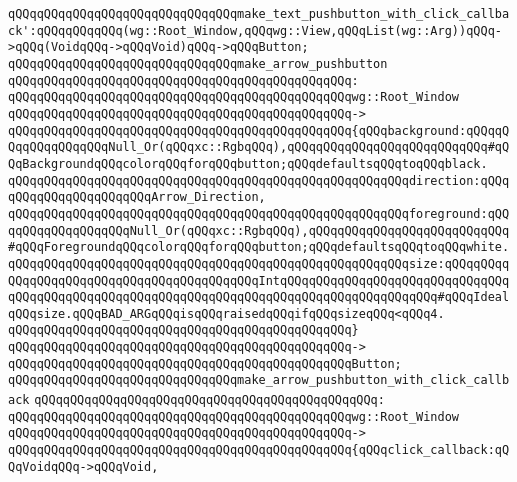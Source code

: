 \verb|qQQqqQQqqQQqqQQqqQQqqQQqqQQqqQQqmake_text_pushbutton_with_click_callback':qQQqqQQqqQQq(wg::Root_Window,qQQqwg::View,qQQqList(wg::Arg))qQQq->qQQq(VoidqQQq->qQQqVoid)qQQq->qQQqButton;|\newline
\newline
\verb|qQQqqQQqqQQqqQQqqQQqqQQqqQQqqQQqmake_arrow_pushbutton|\newline
\verb|qQQqqQQqqQQqqQQqqQQqqQQqqQQqqQQqqQQqqQQqqQQqqQQq:|\newline
\verb|qQQqqQQqqQQqqQQqqQQqqQQqqQQqqQQqqQQqqQQqqQQqqQQqwg::Root_Window|\newline
\verb|qQQqqQQqqQQqqQQqqQQqqQQqqQQqqQQqqQQqqQQqqQQqqQQq->|\newline
\verb|qQQqqQQqqQQqqQQqqQQqqQQqqQQqqQQqqQQqqQQqqQQqqQQq{qQQqbackground:qQQqqQQqqQQqqQQqqQQqNull_Or(qQQqxc::RgbqQQq),qQQqqQQqqQQqqQQqqQQqqQQqqQQq#qQQqBackgroundqQQqcolorqQQqforqQQqbutton;qQQqdefaultsqQQqtoqQQqblack.|\newline
\verb|qQQqqQQqqQQqqQQqqQQqqQQqqQQqqQQqqQQqqQQqqQQqqQQqqQQqqQQqdirection:qQQqqQQqqQQqqQQqqQQqqQQqArrow_Direction,|\newline
\verb|qQQqqQQqqQQqqQQqqQQqqQQqqQQqqQQqqQQqqQQqqQQqqQQqqQQqqQQqforeground:qQQqqQQqqQQqqQQqqQQqNull_Or(qQQqxc::RgbqQQq),qQQqqQQqqQQqqQQqqQQqqQQqqQQq#qQQqForegroundqQQqcolorqQQqforqQQqbutton;qQQqdefaultsqQQqtoqQQqwhite.|\newline
\verb|qQQqqQQqqQQqqQQqqQQqqQQqqQQqqQQqqQQqqQQqqQQqqQQqqQQqqQQqsize:qQQqqQQqqQQqqQQqqQQqqQQqqQQqqQQqqQQqqQQqqQQqIntqQQqqQQqqQQqqQQqqQQqqQQqqQQqqQQqqQQqqQQqqQQqqQQqqQQqqQQqqQQqqQQqqQQqqQQqqQQqqQQqqQQqqQQqqQQq#qQQqIdealqQQqsize.qQQqBAD_ARGqQQqisqQQqraisedqQQqifqQQqsizeqQQq<qQQq4.|\newline
\verb|qQQqqQQqqQQqqQQqqQQqqQQqqQQqqQQqqQQqqQQqqQQqqQQq}|\newline
\verb|qQQqqQQqqQQqqQQqqQQqqQQqqQQqqQQqqQQqqQQqqQQqqQQq->|\newline
\verb|qQQqqQQqqQQqqQQqqQQqqQQqqQQqqQQqqQQqqQQqqQQqqQQqButton;|\newline
\newline
\verb|qQQqqQQqqQQqqQQqqQQqqQQqqQQqqQQqmake_arrow_pushbutton_with_click_callback|\newline
\verb|qQQqqQQqqQQqqQQqqQQqqQQqqQQqqQQqqQQqqQQqqQQqqQQq:|\newline
\verb|qQQqqQQqqQQqqQQqqQQqqQQqqQQqqQQqqQQqqQQqqQQqqQQqwg::Root_Window|\newline
\verb|qQQqqQQqqQQqqQQqqQQqqQQqqQQqqQQqqQQqqQQqqQQqqQQq->|\newline
\verb|qQQqqQQqqQQqqQQqqQQqqQQqqQQqqQQqqQQqqQQqqQQqqQQq{qQQqclick_callback:qQQqVoidqQQq->qQQqVoid,|\newline
